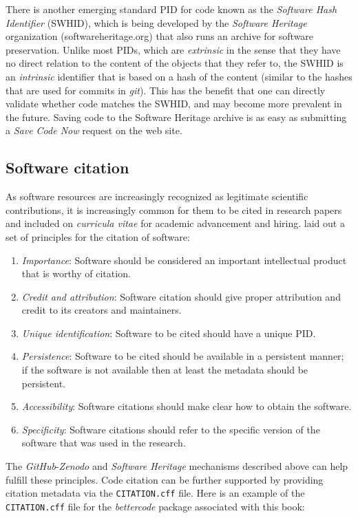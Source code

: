 There is another emerging standard PID for code known as the \textit{Software Hash Identifier} (SWHID), which is being developed by the \textit{Software Heritage} organization (softwareheritage.org) that also runs an archive for software preservation. Unlike most PIDs, which are \textit{extrinsic} in the sense that they have no direct relation to the content of the objects that they refer to, the SWHID is an \textit{intrinsic} identifier that is based on a hash of the content (similar to the hashes that are used for commits in \textit{git}).  This has the benefit that one can directly validate whether code matches the SWHID, and may become more prevalent in the future.  Saving code to the Software Heritage archive is as easy as submitting a \textit{Save Code Now} request on the web site.

\subsection{Software citation}

As software resources are increasingly recognized as legitimate scientific contributions, it is increasingly common for them to be cited in research papers and included on \textit{curricula vitae} for academic advancement and hiring.    \citep{Smith:2016aa} laid out a set of principles for the citation of software:

\begin{enumerate}
\item \textit{Importance}: Software should be considered an important intellectual product that is worthy of citation.
\item \textit{Credit and attribution}: Software citation should give proper attribution and credit to its creators and maintainers.
\item \textit{Unique identification}: Software to be cited should have a unique PID.
\item \textit{Persistence}: Software to be cited should be available in a persistent manner; if the software is not available then at least the metadata should be persistent.
\item \textit{Accessibility}: Software citations should make clear how to obtain the software.
\item \textit{Specificity}: Software citations should refer to the specific version of the software that was used in the research.
\end{enumerate}

The \textit{GitHub}-\textit{Zenodo} and \textit{Software Heritage} mechanisms described above can help fulfill these principles.  Code citation can be further supported by providing citation metadata via the \texttt{CITATION.cff} file.  Here is an example of the \texttt{CITATION.cff} file for the \textit{bettercode} package associated with this book:

